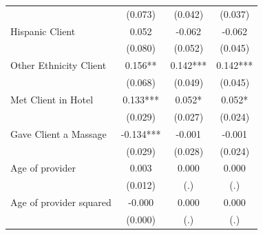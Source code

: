\documentclass[notes=show]{beamer}
\begin{document}
\begin{frame}[plain]
\begin{table}[htbp]
\begin{center}
\begin{threeparttable}
\begin{tabular}{l*{3}{c}}
                    									&     (0.073)   &     (0.042)   &     (0.037) \\
Hispanic Client     									&       0.052   &      -0.062   &      -0.062 \\
                    									&     (0.080)   &     (0.052)   &     (0.045) \\
Other Ethnicity Client									&       0.156** &       0.142***&       0.142*** \\
                    									&     (0.068)   &     (0.049)   &     (0.045) \\
Met Client in Hotel 									&       0.133***&       0.052*  &       0.052* \\
                    									&     (0.029)   &     (0.027)   &     (0.024) \\
Gave Client a Massage									&      -0.134***&      -0.001   &      -0.001 \\
                    									&     (0.029)   &     (0.028)   &     (0.024) \\
Age of provider     									&       0.003   &       0.000   &       0.000 \\
                    									&     (0.012)   &         (.)   &         (.) \\
Age of provider squared									&      -0.000   &       0.000   &       0.000 \\
                    									&     (0.000)   &         (.)   &         (.) \\
\end{tabular}
\end{threeparttable}
\end{center}
\end{table}

\end{frame}
\end{document}
